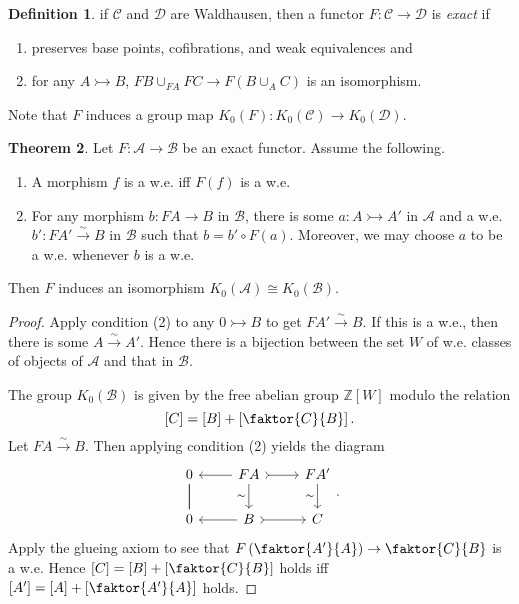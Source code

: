 \documentclass[10pt,letterpaper,cm]{nupset}
\theoremstyle{definition}
\newtheorem{definition}{Definition}[section]
\theoremstyle{theorem}
\newtheorem{theorem}[definition]{Theorem}
\theoremstyle{remark}
\newcommand{\Z}{\mathbb Z}
\newcommand{\1}{\mathbf{1}}
\renewcommand{\a}{\mathscr{A}}
\renewcommand{\b}{\mathscr{B}}
\renewcommand{\c}{\mathscr{C}}
\renewcommand{\d}{\mathscr{D}}
\newcommand{\0}{\vec 0}
\begin{document}
\begin{definition}
if $\c$ and $\d$ are Waldhausen, then a functor $F: \c \to \d$ is \textit{exact} if
\begin{enumerate}[label=(\alph*)] 
\item preserves base points, cofibrations, and weak equivalences and 
\item for any $A \rightarrowtail B$, $FB \cup_{FA} FC \to F(B\cup_A C)$ is an isomorphism. 
\end{enumerate}
\end{definition}

Note that $F$ induces a group map $K_0(F) :K_0(\c) \to K_0(\d)$.

\begin{theorem}
Let $F : \a \to \b$ be an exact functor. Assume the following.
\begin{enumerate}[label=(\arabic*)]
\item A morphism $f$ is a w.e. iff $F(f)$ is a w.e.
\item For any morphism $b : FA \to B$ in $\b$, there is some $a: A \rightarrowtail A'$ in $\a$ and a w.e. $b' : FA' \overset{\sim}{\longrightarrow} B$ in $\b$ such that $b = b' \circ F(a)$. Moreover, we may choose $a$ to be a w.e. whenever $b$ is a w.e.
\end{enumerate}
Then $F$ induces an isomorphism $K_0(\a) \cong K_0(\b)$.
\end{theorem}
\begin{proof}
Apply condition (2) to any $0 \rightarrowtail B$ to get $FA' \overset{\sim}{\longrightarrow} B$. If this is a w.e., then there is some $A \overset{\sim}{\longrightarrow} A'$. Hence there is a bijection between the set $W$ of w.e. classes of objects of $\a$ and that in $\b$. 
\medskip

 The group $K_0(\b)$ is given by the free abelian group $\Z[W]$ modulo the relation $$[C] = [B] + \left[\faktor{C}{B}\right].$$ Let $FA \overset{\sim}{\longrightarrow}  B$. Then applying condition (2) yields the diagram
\[
\begin{tikzcd}
0 \arrow[d, no head] \arrow[d, no head] & FA \arrow[d, "\sim"'] \arrow[r, tail] \arrow[l] & FA' \arrow[d, "\sim"'] \\
0 & B \arrow[r, tail] \arrow[l] & C
\end{tikzcd}.
\]
Apply the glueing axiom to see that $F\left(\faktor{A'}{A}\right) \to \faktor{C}{B}$ is a w.e. Hence $[C] = [B] + \left[\faktor{C}{B}\right]$
 holds iff $[A'] = [A] + \left[\faktor{A'}{A}\right]$ holds.
\end{proof}
\end{document}
